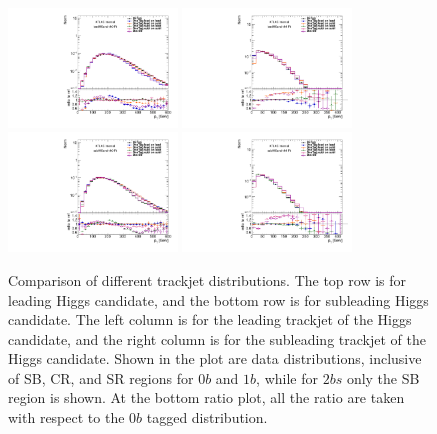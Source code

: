 \begin{figure}[htbp!]
\begin{center}
\includegraphics[width=0.4\textwidth,angle=-90]{figures/boosted/Prereweight/2bs_directcompare_leadHCand_trk0_Pt_1.pdf}
\includegraphics[width=0.4\textwidth,angle=-90]{figures/boosted/Prereweight/2bs_directcompare_leadHCand_trk1_Pt_1.pdf}\\
\includegraphics[width=0.4\textwidth,angle=-90]{figures/boosted/Prereweight/2bs_directcompare_sublHCand_trk0_Pt_1.pdf}
\includegraphics[width=0.4\textwidth,angle=-90]{figures/boosted/Prereweight/2bs_directcompare_sublHCand_trk1_Pt_1.pdf}\\
\caption{Comparison of different trackjet \pt distributions. 
The top row is for leading Higgs candidate, and the bottom row is for subleading Higgs candidate. 
The left column is for the leading trackjet of the Higgs candidate, and the right column is for the subleading trackjet of the Higgs candidate. 
Shown in the plot are data distributions, inclusive of SB, CR, and SR regions for 0$b$ and $1b$, while for $2bs$ only the SB region is shown. At the bottom ratio plot, all the ratio are taken with respect to the 0$b$ tagged distribution.}
\label{fig:rw-2bs-comp}
\end{center}
\end{figure}

